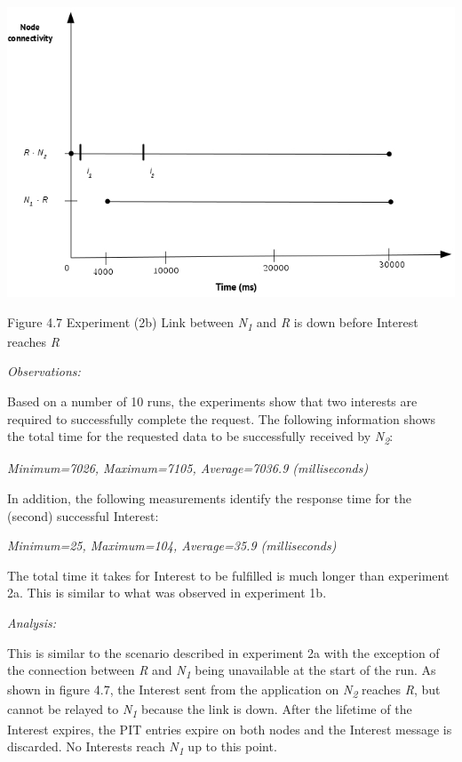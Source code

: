 \documentclass[a4paper,12pt]{report}      %
\begin{document}
\noindent\includegraphics[scale=0.55]{exp2b_timediag.jpg}\newline
\begin{center}Figure 4.7 Experiment (2b) Link between \emph{N\textsubscript{1}} and \emph{R} is down before Interest reaches \emph{R}\end{center}

\vspace*{1\baselineskip}\noindent\emph{Observations:}

Based on a number of 10 runs, the experiments show that two interests are required to successfully
complete the request. The following information shows the total time for the requested data to be
successfully received by  \emph{N\textsubscript{2}}:

\begin{center}\textsl{Minimum=7026, Maximum=7105, Average=7036.9 (milliseconds)}\end{center}

In addition, the following measurements identify the response time for the (second) successful Interest:

\begin{center}\textsl{Minimum=25, Maximum=104, Average=35.9 (milliseconds)}\end{center}

The total time it takes for Interest to be fulfilled is much longer than experiment 2a. This is similar to what was observed in experiment 1b.

\vspace*{1\baselineskip}\noindent\emph{Analysis:}

This is similar to the scenario described in experiment 2a with the exception of the connection between 
 \emph{R} and \emph{N\textsubscript{1}} being unavailable at the start of the run. As shown in figure 4.7, the Interest sent from the application
on \emph{N\textsubscript{2}} reaches \emph{R}, but cannot be relayed to \emph{N\textsubscript{1}} because the link is down. After
the lifetime of the Interest expires, the PIT entries expire on both nodes and the Interest message is
discarded. No Interests reach \emph{N\textsubscript{1}} up to this point.
\end{document}
